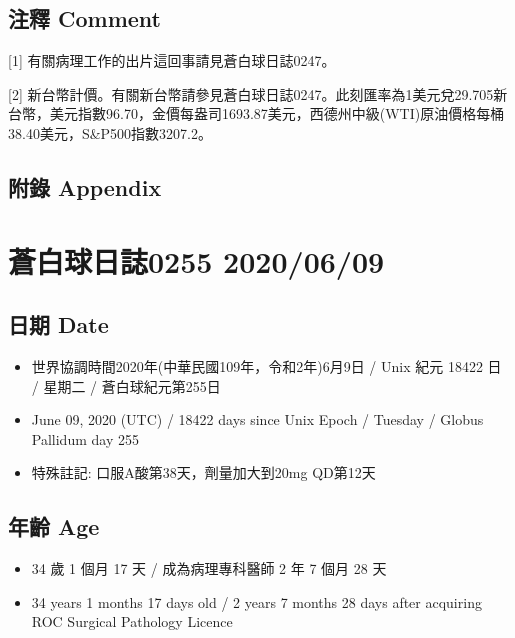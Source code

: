 \documentclass[
]{article}
\providecommand{\tightlist}{%
  \setlength{\itemsep}{0pt}\setlength{\parskip}{0pt}}
\begin{document}
\hypertarget{ux6ce8ux91cb-comment-7}{%
\subsection{注釋 Comment}\label{ux6ce8ux91cb-comment-7}}

{[}1{]} 有關病理工作的出片這回事請見蒼白球日誌0247。

{[}2{]}
新台幣計價。有關新台幣請參見蒼白球日誌0247。此刻匯率為1美元兌29.705新台幣，美元指數96.70，金價每盎司1693.87美元，西德州中級(WTI)原油價格每桶38.40美元，S\&P500指數3207.2。

\hypertarget{ux9644ux9304-appendix-7}{%
\subsection{附錄 Appendix}\label{ux9644ux9304-appendix-7}}

\hypertarget{ux84bcux767dux7403ux65e5ux8a8c0255-20200609}{%
\section{蒼白球日誌0255
2020/06/09}\label{ux84bcux767dux7403ux65e5ux8a8c0255-20200609}}

\hypertarget{ux65e5ux671f-date-8}{%
\subsection{日期 Date}\label{ux65e5ux671f-date-8}}

\begin{itemize}
\tightlist
\item
  世界協調時間2020年(中華民國109年，令和2年)6月9日 / Unix 紀元 18422 日
  / 星期二 / 蒼白球紀元第255日
\item
  June 09, 2020 (UTC) / 18422 days since Unix Epoch / Tuesday / Globus
  Pallidum day 255
\item
  特殊註記: 口服A酸第38天，劑量加大到20mg QD第12天
\end{itemize}

\hypertarget{ux5e74ux9f61-age-8}{%
\subsection{年齡 Age}\label{ux5e74ux9f61-age-8}}

\begin{itemize}
\tightlist
\item
  34 歲 1 個月 17 天 / 成為病理專科醫師 2 年 7 個月 28 天
\item
  34 years 1 months 17 days old / 2 years 7 months 28 days after
  acquiring ROC Surgical Pathology Licence
\end{itemize}
\end{document}
